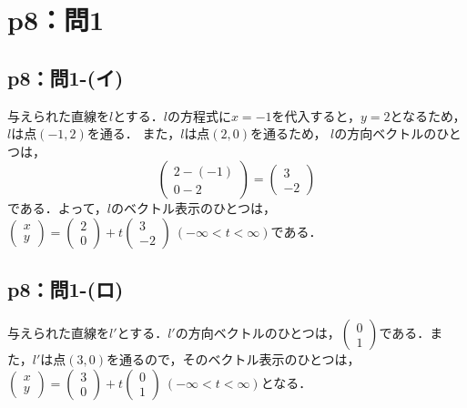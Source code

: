 \section*{p8：問1}


\subsection*{p8：問1-(イ)}

\begin{tanswer}
  与えられた直線を$l$とする．$l$の方程式に$x=-1$を代入すると，$y=2$となるため，$l$は点$(-1,2)$を通る．
  また，$l$は点$(2,0)$を通るため，
  $l$の方向ベクトルのひとつは，
  \[
    \begin{pmatrix}
      2-(-1) \\
      0-2
    \end{pmatrix}
    =
    \begin{pmatrix}
      3 \\
      -2
    \end{pmatrix}
  \]
  である．よって，$l$のベクトル表示のひとつは，
  $
    \begin{pmatrix}
      x \\
      y
    \end{pmatrix}
    =
    \begin{pmatrix}
      2 \\
      0
    \end{pmatrix}
    +t
    \begin{pmatrix}
      3 \\
      -2
    \end{pmatrix}
    ~(-\infty < t < \infty)$である．
\end{tanswer}


\subsection*{p8：問1-(ロ)}

\begin{tanswer}
  与えられた直線を$l'$とする．$l '$の方向ベクトルのひとつは，$
    \begin{pmatrix}
      0 \\
      1
    \end{pmatrix}
  $である．また，$l '$は点$(3,0)$を通るので，そのベクトル表示のひとつは，
  $
    \begin{pmatrix}
      x \\
      y
    \end{pmatrix}
    =
    \begin{pmatrix}
      3 \\
      0
    \end{pmatrix}
    +t
    \begin{pmatrix}
      0 \\
      1
    \end{pmatrix}
    ~(-\infty < t < \infty)
  $となる．
\end{tanswer}

